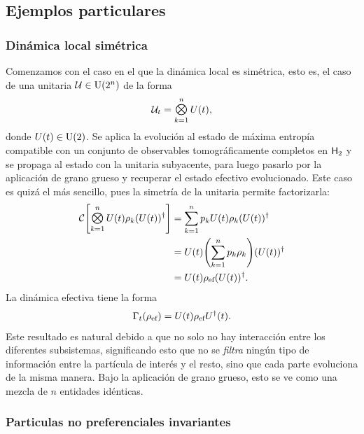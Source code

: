 \subsection{Ejemplos particulares}

\subsubsection{Dinámica local simétrica}

Comenzamos con el caso en el que la dinámica local es simétrica, esto es, el caso de una unitaria $\mathcal{U}\in\text{U}(2^{n})$ de la forma
\begin{equation}
    \mcU_{t}=\Motimes_{k=1}^{n}U(t),\nonumber
\end{equation}
donde $U(t)\in\text{U}(2)$. Se aplica la evolución al estado de máxima entropía compatible con un conjunto de observables tomográficamente completos en ${\sf H}_{2}$ y se propaga al estado con la unitaria subyacente, para luego pasarlo por la aplicación de grano grueso y recuperar el estado efectivo evolucionado. Este caso es quizá el más sencillo, pues la simetría de la unitaria permite factorizarla:
\begin{align}
\mcC\qty[\Motimes_{k=1}^{n}U(t) \rho_{k} (U(t))^{\dag}]&=\sum_{k=1}^{n}p_{k} U(t) \rho_{k} (U(t))^{\dag}\nonumber \\
&=U(t)\qty(\sum_{k=1}^{n}p_{k} \rho_{k}) (U(t))^{\dag}\nonumber\\
&=U(t)\rho_{\ef}(U(t))^{\dag}.\nonumber
\end{align}
La dinámica efectiva tiene la forma
\begin{equation}\label{eq:EffectiveSymmetricLocal}
    \Gamma_{t}(\rho_{\text{ef}})=U(t)\rho_{\text{ef}}U^\dag(t).
\end{equation}
Este resultado es natural debido a que no solo no hay interacción entre los diferentes subsistemas, significando esto que no se \textit{filtra} ningún tipo de información entre la partícula de interés y el resto, sino que cada parte evoluciona de la misma manera. Bajo la aplicación de grano grueso, esto se ve como una mezcla de $n$ entidades idénticas.

\subsubsection{Particulas no preferenciales invariantes}

